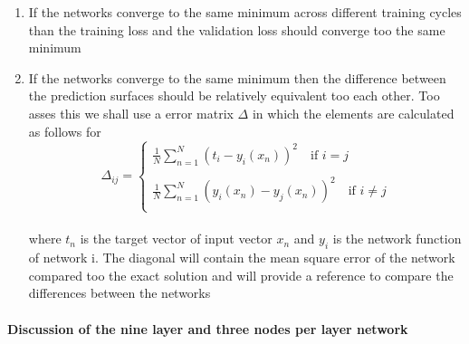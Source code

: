 \documentclass[]{article}
\begin{document}
\begin{enumerate}
	\item If the networks converge to the same minimum across different training cycles than the training loss and the validation loss should converge too the same minimum
	\item If the networks converge to the same minimum then the difference between the prediction surfaces should be relatively equivalent too each other. Too asses this we shall use a error matrix $\Delta$ in which the elements are calculated as follows for 
	\\
	\begin{equation*}
		\Delta_{ij} =
		\begin{cases}
			\frac{1}{N} \sum_{n=1}^{N} \left(t_i- y_{i}(x_n)\right)^2 \quad \text{if } i=j \\
			\\
			\frac{1}{N} \sum_{n=1}^{N} \left(y_{i}(x_n)-y_{j}(x_n)\right)^2 \quad \text{if } i \neq j \\
		\end{cases}
	\end{equation*}
	\\
	where $t_n$ is the target vector of input vector $x_n$ and $y_i$ is the network function of network i. The diagonal will contain the mean square error of the network compared too the exact solution and will provide a reference to compare the differences between the networks
\end{enumerate}

\paragraph{Discussion of the nine layer and three nodes per layer network}
\end{document}
